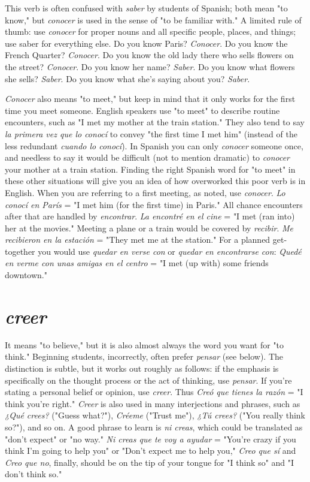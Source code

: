 \documentclass[14pt,a4paper,oneside]{memoir}
\begin{document}
This verb is often confused with \emph{saber} by students of Spanish;
both mean "to know," but \emph{conocer} is used in the sense of "to be familiar with." A limited rule of thumb: use \emph{conocer} for proper nouns and
all specific people, places, and things; use saber for everything else. Do
you know Paris? \emph{Conocer}. Do you know the French Quarter? \emph{Conocer}.
Do you know the old lady there who sells flowers on the street? \emph{Conocer}. Do you know her name? \emph{Saber}. Do you know what flowers she
sells? \emph{Saber}. Do you know what she's saying about you? \emph{Saber}.

\emph{Conocer} also means "to meet," but keep in mind that it only
works for the first time you meet someone. English speakers use "to
meet" to describe routine encounters, such as "I met my mother at
the train station." They also tend to say \emph{la primera vez que lo conocí}
to convey "the first time I met him" (instead of the less redundant
\emph{cuando lo conocí}). In Spanish you can only \emph{conocer} someone once, and
needless to say it would be difficult (not to mention dramatic) to \emph{conocer} your mother at a train station. Finding the right Spanish word for
"to meet" in these other situations will give you an idea of how overworked this poor verb is in English. When you are referring to a first
meeting, as noted, use \emph{conocer}. \emph{Lo conocí en París} = "I met him (for
the first time) in Paris." All chance encounters after that are handled
by \emph{encontrar}. \emph{La encontré en el cine} = "I met (ran into) her at the
movies." Meeting a plane or a train would be covered by \emph{recibir}. \emph{Me
recibieron en la estación} = "They met me at the station." For a
planned get-together you would use \emph{quedar en verse con} or \emph{quedar en
encontrarse con}: \emph{Quedé en verme con unas amigas en el centro} = "I
met (up with) some friends downtown."

\section{\emph{creer}}

It means "to believe," but it is also almost always the word
you want for "to think." Beginning students, incorrectly, often prefer
\emph{pensar} (see below). The distinction is subtle, but it works out roughly
as follows: if the emphasis is specifically on the thought process or the
act of thinking, use \emph{pensar}. If you're stating a personal belief or opinion, use \emph{creer}. Thus \emph{Creó que tienes la razón} = "I think you're right."
\emph{Creer} is also used in many interjections and phrases, such as \emph{¿Qué
crees?} ("Guess what?"), \emph{Créeme} ("Trust me"), \emph{¿Tú crees?} ("You really
think so?"), and so on. A good phrase to learn is \emph{ni creas}, which could
be translated as "don't expect" or "no way." \emph{Ni creas que te voy a ayudar} = "You're crazy if you think I'm going to help you" or "Don't expect me to help you," \emph{Creo que sí} and \emph{Creo que no}, finally, should be
on the tip of your tongue for "I think so" and "I don't think so."
\end{document}
